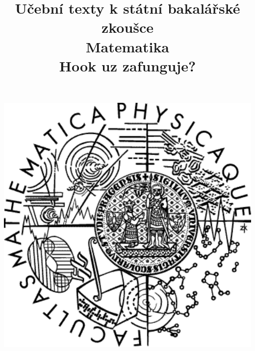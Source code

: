 \clearpage

\clearpage

\title{\LARGE Učební texty k státní bakalářské zkoušce \\ Matematika \\ Hook uz zafunguje?}




\maketitle

\vspace{10mm}
\begin{center}
\includegraphics[scale=0.5]{common/logo.pdf}
\end{center} 

\clearpage

\clearpage

\tableofcontents


\newpage

\newpage

\newpage

\newpage

\newpage

\newpage

\newpage

\newpage

\newpage

\newpage

\newpage

\newpage

\newpage

\newpage

\newpage

\newpage

\newpage



